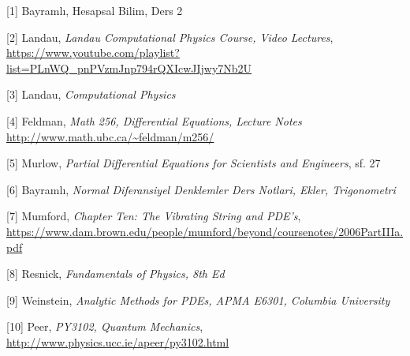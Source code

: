 \documentclass[12pt,fleqn]{article}\usepackage{../../common}
\begin{document}
[1] Bayramlı, Hesapsal Bilim, Ders 2 

[2] Landau, {\em Landau Computational Physics Course, Video Lectures},
    \url{https://www.youtube.com/playlist?list=PLnWQ_pnPVzmJnp794rQXIcwJIjwy7Nb2U}

[3] Landau, {\em Computational Physics}

[4] Feldman, {\em Math 256, Differential Equations, Lecture Notes}
    \url{http://www.math.ubc.ca/~feldman/m256/}

[5] Murlow, {\em Partial Differential Equations for Scientists and Engineers}, sf. 27

[6] Bayramlı, {\em Normal Diferansiyel Denklemler Ders Notlari, Ekler, Trigonometri}

[7] Mumford, {\em Chapter Ten: The Vibrating String and PDE's},
    \url{https://www.dam.brown.edu/people/mumford/beyond/coursenotes/2006PartIIIa.pdf}

[8] Resnick, {\em Fundamentals of Physics, 8th Ed}
    
[9] Weinstein, {\em Analytic Methods for PDEs, APMA E6301, Columbia University}

[10] Peer, {\em PY3102, Quantum Mechanics},
     \url{http://www.physics.ucc.ie/apeer/py3102.html}

     
\end{document}
